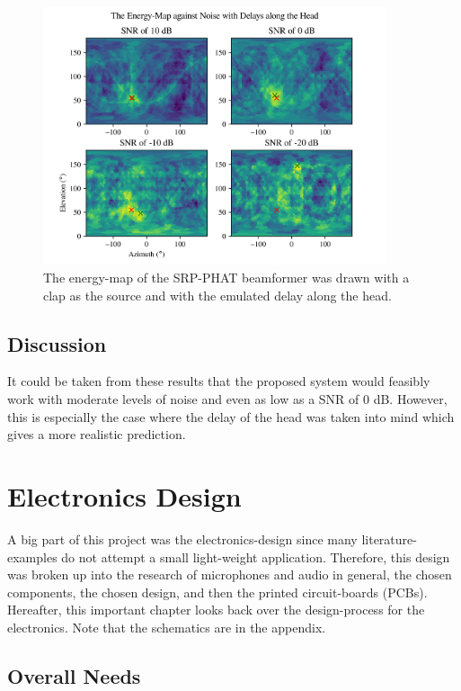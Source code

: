 \documentclass[notitlepage]{report}
\begin{document}
\begin{figure}[H]
\includegraphics[width=0.9\textwidth]{../Python/main_method/delay/head/map.png}
\centering
\caption{The energy-map of the SRP-PHAT beamformer was drawn with a clap as the source and with the emulated delay along the head.}
\label{fig:mm_delay_map_clap}
\centering
\end{figure}

\section{Discussion}

It could be taken from these results that the proposed system would feasibly work with moderate levels of noise and even as low as a SNR of 0 \si{dB}. However, this is especially the case where the delay of the head was taken into mind which gives a more realistic prediction.

\chapter{Electronics Design}

A big part of this project was the electronics-design since many literature-examples do not attempt a small light-weight application. Therefore, this design was broken up into the research of microphones and audio in general, the chosen components, the chosen design, and then the printed circuit-boards (PCBs). Hereafter, this important chapter looks back over the design-process for the electronics. Note that the schematics are in the appendix.

\section{Overall Needs}
\end{document}
